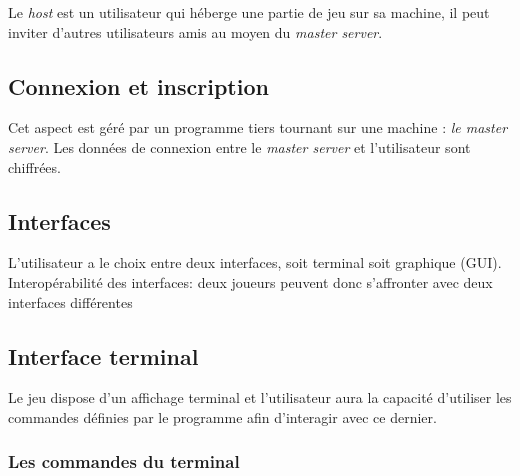 \documentclass[a4paper,10pt]{article}
\begin{document}
Le \textit{host} est un utilisateur qui héberge une partie de jeu sur sa machine, il peut inviter d'autres utilisateurs amis au moyen du \textit{master server}.
\subsection{Connexion et inscription}
Cet aspect est géré par un programme tiers tournant sur une machine : \textit{le master server}. Les données de connexion entre le \textit{master server} et l'utilisateur sont chiffrées.
\subsection{Interfaces}
L'utilisateur a le choix entre deux interfaces, soit terminal soit graphique (GUI). Interopérabilité des interfaces: deux joueurs peuvent donc s'affronter avec deux interfaces différentes
\subsection{Interface terminal}
Le jeu dispose d'un affichage terminal et l'utilisateur aura la capacité d'utiliser les commandes définies par le programme afin d'interagir avec ce dernier.
\subsubsection{Les commandes du terminal}
\end{document}
